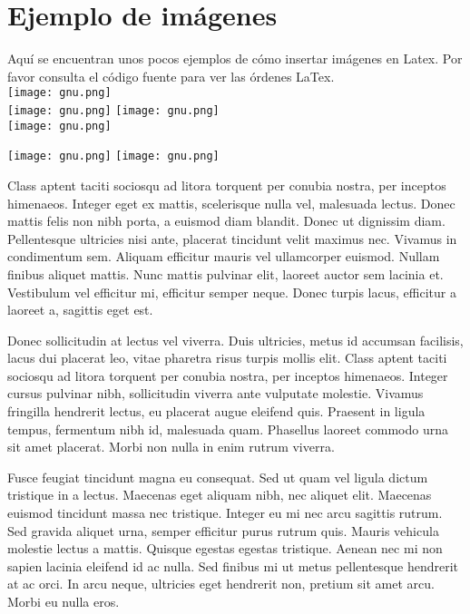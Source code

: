 \section{Ejemplo de imágenes}


Aquí se encuentran unos pocos ejemplos de cómo insertar imágenes en Latex. Por favor consulta el código fuente para ver las órdenes LaTex. 
\\
\texttt{[image: gnu.png]}\\
\texttt{[image: gnu.png]}
\texttt{[image: gnu.png]}
\\
\texttt{[image: gnu.png]}\\
\begin{center}
\texttt{[image: gnu.png]}
\texttt{[image: gnu.png]}
\end{center}


Class aptent taciti sociosqu ad litora torquent per conubia nostra, per inceptos himenaeos. Integer eget ex mattis, scelerisque nulla vel, malesuada lectus. Donec mattis felis non nibh porta, a euismod diam blandit. Donec ut dignissim diam. Pellentesque ultricies nisi ante, placerat tincidunt velit maximus nec. Vivamus in condimentum sem. Aliquam efficitur mauris vel ullamcorper euismod. Nullam finibus aliquet mattis. Nunc mattis pulvinar elit, laoreet auctor sem lacinia et. Vestibulum vel efficitur mi, efficitur semper neque. Donec turpis lacus, efficitur a laoreet a, sagittis eget est.

Donec sollicitudin at lectus vel viverra. Duis ultricies, metus id accumsan facilisis, lacus dui placerat leo, vitae pharetra risus turpis mollis elit. Class aptent taciti sociosqu ad litora torquent per conubia nostra, per inceptos himenaeos. Integer cursus pulvinar nibh, sollicitudin viverra ante vulputate molestie. Vivamus fringilla hendrerit lectus, eu placerat augue eleifend quis. Praesent in ligula tempus, fermentum nibh id, malesuada quam. Phasellus laoreet commodo urna sit amet placerat. Morbi non nulla in enim rutrum viverra.

Fusce feugiat tincidunt magna eu consequat. Sed ut quam vel ligula dictum tristique in a lectus. Maecenas eget aliquam nibh, nec aliquet elit. Maecenas euismod tincidunt massa nec tristique. Integer eu mi nec arcu sagittis rutrum. Sed gravida aliquet urna, semper efficitur purus rutrum quis. Mauris vehicula molestie lectus a mattis. Quisque egestas egestas tristique. Aenean nec mi non sapien lacinia eleifend id ac nulla. Sed finibus mi ut metus pellentesque hendrerit at ac orci. In arcu neque, ultricies eget hendrerit non, pretium sit amet arcu. Morbi eu nulla eros.

